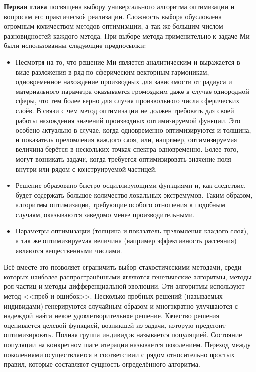 \underline{\textbf{Первая глава}} посвящена выбору универсального
алгоритма оптимизации и вопросам его практической
реализации. Сложность выбора обусловлена огромным количеством методов
оптимизации, а так же большим числом разновидностей каждого
метода. При выборе метода применительно к задаче Ми были использованны
следующие предпосылки:
\begin{itemize}
\item Несмотря на то, что решение Ми является аналитическим и
  выражается в виде разложения в ряд по сферическим векторным
  гармоникам, одновременное нахождение производных для зависимости от
  радиуса и материального параметра оказывается громоздким даже в
  случае однородной сферы, что тем более верно для случая
  произвольного числа сферических слоёв.  В связи с чем метод
  оптимизации не должен требовать для своей работы нахождения значений
  производных оптимизируемой функции.  Это особено актуально в случае,
  когда одновременно оптимизируются и толщина, и показатель
  преломления каждого слоя, или, например, оптимизируемая величина
  берётся в нескольких точках спектра одновременно.  Более того, могут
  возникать задачи, когда требуется оптимизировать значение поля внутри
  или рядом с конструируемой частицей.
\item Решение образовано быстро-осциллирующими функциями и, как
  следствие, будет содержать большое количество локальных
  экстремумов. Таким образом, алгоритмы оптимизации, требующие особого
  отношения к подобным случаям, оказываются заведомо менее
  производительными.
\item Параметры оптимизации (толщина и показатель
  преломления каждого слоя), а так же оптимизируемая величина
  (например эффективность рассеяния) являются
  вещественными числами.
\end{itemize}

Всё вместе это позволяет ограничить выбор стахостическими методами,
среди которых наиболее распространёнными являются генетические
алгоритмы, методы роя частиц и методы дифференциальной эволюции.  Эти
алгоритмы используют метод <<проб и ошибок>>.  Несколько пробных
решений (называемых индивидами) генерируются случайным образом и
многократно улучшаются с надеждой найти некое удовлетворительное
решение. Качество решения оценивается целевой функцией, возникшей из
задачи, которую предстоит оптимизировать.  Полная группа индивидов
называется популяцией.  Состояние популяции на конкретном шаге
итерации называется поколением.  Переход между поколениями
осуществляется в соответствии с рядом относительно простых правил,
которые составляют сущность определённого алгоритма.

